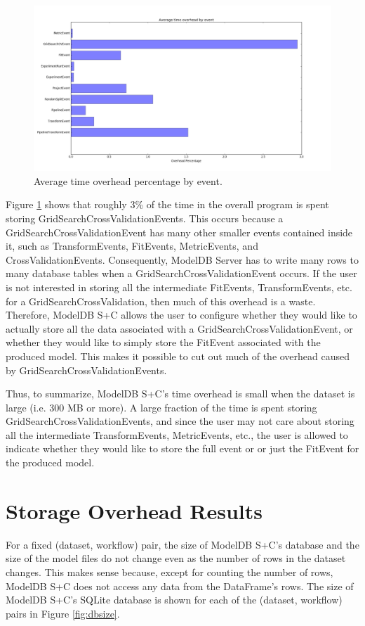 \begin{figure}
  \centering
  \includegraphics[width=6.0in]{event_time_overhead}
  \caption{
    Average time overhead percentage by event.
  }
  \label{fig:event_time_overhead}
\end{figure}

Figure \ref{fig:event_time_overhead} shows that roughly 3\% of the time in the overall
program is spent storing GridSearchCrossValidationEvents. This occurs because a GridSearchCrossValidationEvent
has many other smaller events contained inside it, such as TransformEvents, FitEvents, MetricEvents, and 
CrossValidationEvents. Consequently, ModelDB Server has to write many rows to many database tables when a
GridSearchCrossValidationEvent occurs. If the user is not interested in storing all the intermediate FitEvents,
TransformEvents, etc. for a GridSearchCrossValidation, then much of this overhead is a waste. Therefore, ModelDB S+C
allows the user to configure whether they would like to actually store all the data associated with a GridSearchCrossValidationEvent,
or whether they would like to simply store the FitEvent associated with the produced model. This makes it possible to cut out
much of the overhead caused by GridSearchCrossValidationEvents.

Thus, to summarize, ModelDB S+C's time overhead is small when the dataset is large (i.e. 300 MB or more). A
large fraction of the time is spent storing GridSearchCrossValidationEvents, and since the user may not
care about storing all the intermediate TransformEvents, MetricEvents, etc., the user is allowed to indicate 
whether they would like to store the full event or or just the FitEvent for the produced model.

\section{Storage Overhead Results}
For a fixed (dataset, workflow) pair, the size of ModelDB S+C's database and the size of the
model files do not change even as the number of rows in the dataset changes. This makes sense
because, except for counting the number of rows, ModelDB S+C does not access any data from the
DataFrame's rows. The size of ModelDB S+C's SQLite database is shown for each of the (dataset, workflow)
pairs in Figure \ref{fig:dbsize}.

